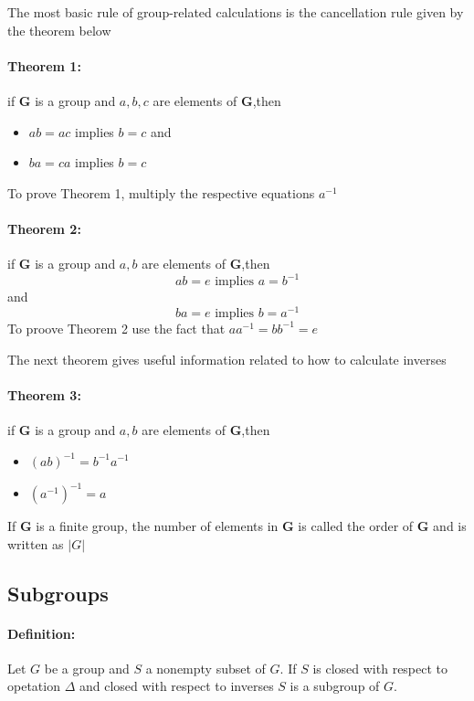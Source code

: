 \documentclass[fontsize=12pt]{article}
\begin{document}
 The most basic rule of group-related calculations is the cancellation rule given by
 the theorem below
 
 \paragraph{Theorem 1: } if $\mathbf{G}$ is a group and $a,b,c$ are elements of 
 $\mathbf{G}$,then
 \begin{itemize}
\item $ab=ac$ implies $b=c$ and
\item $ba=ca$ implies $b=c$
\end{itemize}
To prove Theorem 1, multiply the respective equations $a^{-1}$

\paragraph{Theorem 2: }if $\mathbf{G}$ is a group and $a,b$ are elements of 
 $\mathbf{G}$,then
 $$ ab =e \text{ implies } a=b^{-1}$$ and
 $$ ba =e \text{ implies } b=a^{-1}$$
 To proove Theorem 2 use the fact that $aa^{-1}=bb^{-1} = e$
 
 The next theorem gives useful information related to how to calculate inverses
 
 \paragraph{Theorem 3: }if $\mathbf{G}$ is a group and $a,b$ are elements of 
 $\mathbf{G}$,then
 \begin{itemize}
 \item $(ab)^{-1} = b^{-1}a^{-1}$
 \item $(a^{-1})^{-1} =a$
 \end{itemize}
 
 If $\mathbf{G}$ is a finite group, the number of elements in $\mathbf{G}$ is called
 the order of $\mathbf{G}$ and is written as $|G|$
 
 \subsection{Subgroups}
 \paragraph{Definition: }Let $G$ be a group and $S$ a nonempty subset of $G$. 
 If $S$ is closed with respect 
 to opetation $\Delta$ and closed with respect to inverses $S$ is a subgroup of $G$.
 
\end{document}
